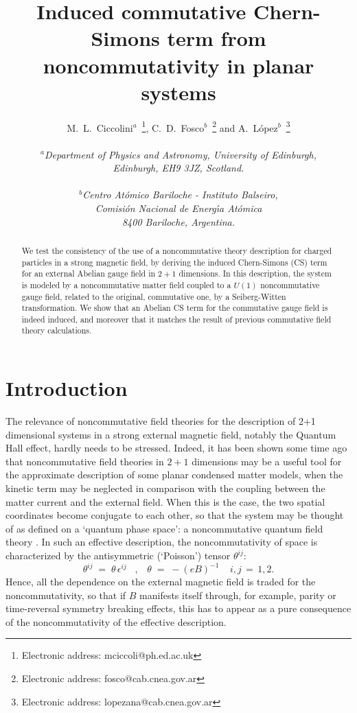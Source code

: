 \documentclass[a4paper,12pt]{article}
\title{Induced commutative Chern-Simons term from noncommutativity in
  planar systems}
\author{M.~L.~Ciccolini$^a$~\footnote{Electronic address:
    mciccoli@ph.ed.ac.uk}, C.~D.~Fosco$^b$~\footnote{Electronic
    address: fosco@cab.cnea.gov.ar} and
  A.~L{\'o}pez$^b$~\footnote{Electronic address: lopezana@cab.cnea.gov.ar}
  \\ \\
  {\normalsize\it $^a$Department of Physics and Astronomy, University of Edinburgh,}\\
  {\normalsize\it Edinburgh, EH9 3JZ, Scotland.}\\ \\
  {\normalsize\it $^b$Centro At{\'o}mico Bariloche - Instituto Balseiro,}\\
  {\normalsize\it Comisi{\'o}n Nacional de Energ{\'\i}a At{\'o}mica}\\
  {\normalsize\it 8400 Bariloche, Argentina.}}
\date{}
\begin{document}
\maketitle
\begin{abstract}
\noindent We test the consistency of the use of a noncommutative 
theory description for charged particles in a strong magnetic field,
by deriving the induced Chern-Simons (CS) term for an external Abelian
gauge field in $2+1$ dimensions.  In this description, the system is
modeled by a noncommutative matter field coupled to a $U(1)$
noncommutative gauge field, related to the original, commutative one,
by a Seiberg-Witten transformation.  We show that an Abelian CS term
for the commutative gauge field is indeed induced, and moreover that
it matches the result of previous commutative field theory
calculations.
\end{abstract}
\newpage
\section{Introduction}\label{sec:intro}
The relevance of noncommutative field theories for the description of
2+1 dimensional systems in a strong external magnetic field, notably
the Quantum Hall effect, hardly needs to be stressed.  Indeed, it has
been shown some time ago that noncommutative field theories in $2+1$
dimensions may be a useful tool for the approximate description of
some planar condensed matter models, when the kinetic term may be
neglected in comparison with the coupling between the matter current
and the external field. When this is the case, the two spatial
coordinates become conjugate to each other, so that the system may be
thought of as defined on a `quantum phase space': a noncommutative
quantum field theory \cite{susskind,PP,KS,MS,PA,LMR,DN,AP,cesarana}.  
In such
 an effective description, the noncommutativity of space is
characterized by the antisymmetric (`Poisson') tensor $\theta^{ij}$:
\begin{equation}
\theta^{ij}\;=\; \theta \, \epsilon^{ij} \;\;\;,\;\;\; 
\theta \;=\; - (eB)^{-1} \;\;\;\; i,j \,=\, 1,2.
\end{equation}
Hence, all the dependence on the external magnetic field is traded for
the noncommutativity, so that if $B$ manifests itself through, for
example, parity or time-reversal symmetry breaking effects, this has
to appear as a pure consequence of the noncommutativity of the
effective description.
\end{document}
